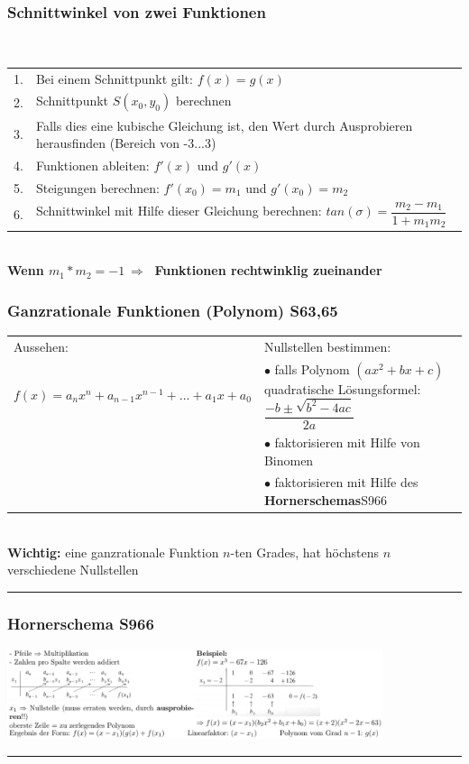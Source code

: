 \documentclass[6pt,a4paper]{scrartcl}
\begin{document}
\begin{multicols*}{2}
\subsubsection{Schnittwinkel von zwei Funktionen}\
\begin{tabular}{cl}
	1.& Bei einem Schnittpunkt gilt: $f(x) = g(x)$\\
	2.& Schnittpunkt $S(x_{0}, y_{0})$ berechnen\\
	3.& Falls dies eine kubische Gleichung ist, den Wert durch Ausprobieren herausfinden (Bereich von -3...3)\\
	4.& Funktionen ableiten: $f'(x)$ und $g'(x)$\\
	5.& Steigungen berechnen: $f'(x_{0})=m_{1}$ und $g'(x_{0})=m_{2}$\\
	6.& Schnittwinkel mit Hilfe dieser Gleichung berechnen: $tan(\sigma)=\dfrac{m_{2}-m_{1}}{1+m_{1}m_{2}}$\\
\end{tabular}\\
\textbf{Wenn $m_{1}*m_{2}=-1 \ \Rightarrow \ $ Funktionen rechtwinklig zueinander}
\columnbreak

\subsubsection{Ganzrationale Funktionen (Polynom) \color{red}S63,65}
\begin{tabular}{ll}
	Aussehen: & Nullstellen bestimmen:\\
	$f(x)=a_{n}x^{n}+a_{n-1}x^{n-1}+...+a_{1}x+a_{0}$ & $\bullet$ falls Polynom $(ax^{2}+bx+c)$ quadratische Lösungsformel: $\dfrac{-b\pm \sqrt{b^{2}-4ac}}{2a}$\\
	& $\bullet$ faktorisieren mit Hilfe von Binomen\\
	& $\bullet$ faktorisieren mit Hilfe des \textbf{Hornerschemas}\color{red}S966\\
\end{tabular}
\\
\textbf{Wichtig:} eine ganzrationale Funktion $n$-ten Grades, hat höchstens $n$ verschiedene Nullstellen\\
\hrule
\subsubsection{Hornerschema \color{red}S966}
\includegraphics[width=11cm]{Horner.PNG}\\
\hrule

\end{multicols*}
\end{document}
